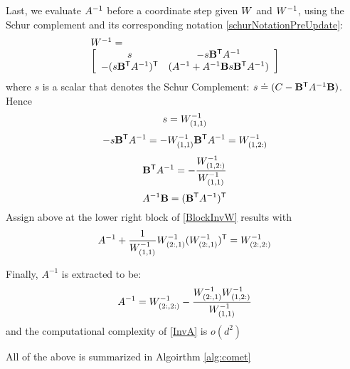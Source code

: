 \documentclass{article}
\begin{document}
Last, we evaluate ${A}^{-1}$ before a coordinate step given ${W}$ and ${W}^{-1}$, using the Schur complement and its corresponding notation \eqref{schurNotationPreUpdate}:
\begin{equation}
\begin{array}{l}
 {W}^{-1} =  \\
 \left[ \begin{array}{cc} s & -s \mathbf{B}{}^\mathsf{T} {A}^{-1} \\ -(s \mathbf{B}{}^\mathsf{T} {A}^{-1} ){}^\mathsf{T} & ({A}^{-1} + {A}^{-1} \mathbf{B} s \mathbf{B}{}^\mathsf{T} {A}^{-1} ) \end{array}  \right]
\end{array}
\label{BlockInvW}
\end{equation}
where $s$ is a scalar that denotes the Schur Complement:  $s \doteq ({C}-\mathbf{B}{}^\mathsf{T} {A}^{-1} \mathbf{B})$. Hence
\begin{equation}
s = {W}^{-1}_{(1,1)}
\label{invWkk}
\end{equation}
\begin{equation}
-s \mathbf{B}{}^\mathsf{T} {A}^{-1} = -{W}^{-1}_{(1,1)} \mathbf{B}{}^\mathsf{T} {A}^{-1} = {W}^{-1}_{(1,2:)}
\end{equation}
\begin{equation}
\mathbf{B}{}^\mathsf{T} {A}^{-1} = -\frac{{W}^{-1}_{(1,2:)}}{{W}^{-1}_{(1,1)} }
\end{equation}
\begin{equation}
{A}^{-1}\mathbf{B} = (\mathbf{B}{}^\mathsf{T} {A}^{-1}){}^\mathsf{T}
\label{invA_Btrans}
\end{equation}
Assign above at the lower right block of \eqref{BlockInvW} results with
\begin{equation}
 {A}^{-1} + \frac{1}{{W}^{-1}_{(1,1)} } {W}^{-1}_{(2:,1)} ({W}^{-1}_{(2:,1)}){}^\mathsf{T} = {W}^{-1}_{(2:,2:)}
\end{equation}

Finally, $A^{-1}$ is extracted to be:
\begin{equation}
{A}^{-1} = {W}^{-1}_{(2:,2:)}- \frac{{W}^{-1}_{(2:,1)} {W}^{-1}_{(1,2:)}}{{W}^{-1}_{(1,1)}}
\label{InvA}
\end{equation}
and the computational complexity of \eqref{InvA} is $o(d^2)$


All of the above is summarized in Algoirthm \ref{alg:comet}
\end{document}
